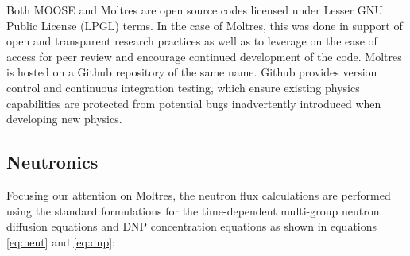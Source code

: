 Both \gls{MOOSE} and Moltres are open source codes licensed under Lesser GNU
Public License (LPGL) terms. In the case of Moltres, this was done in support
of open and transparent research practices as well as to leverage on the ease
of access for peer review and encourage continued development of the code.
Moltres is hosted on a Github repository of the same name. Github provides
version control and continuous integration testing, which ensure existing
physics capabilities are protected from potential bugs inadvertently
introduced when developing new physics.

\subsection{Neutronics}

Focusing our attention on Moltres, the neutron flux calculations are
performed using the standard formulations for the time-dependent multi-group
neutron diffusion equations and \gls{DNP} concentration equations as shown in
equations \ref{eq:neut} and \ref{eq:dnp}:
%
